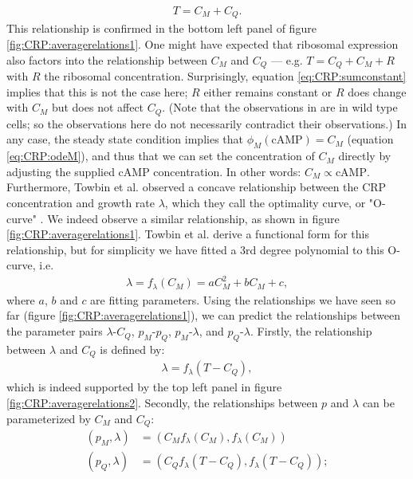 \begin{align}
	\label{eq:CRP:sumconstant}	
	T = C_M + C_Q
	.
\end{align}
This relationship is confirmed in the bottom left panel of figure \ref{fig:CRP:averagerelations1}. 
One might have expected that ribosomal expression also factors into the relationship between $C_M$ and $C_Q$ --- e.g. $T=C_Q+C_M+R$ with $R$ the ribosomal concentration.
Surprisingly, equation \ref{eq:CRP:sumconstant} implies that this is not the case here; $R$ either remains constant or $R$ does change with $C_M$ but does not affect $C_Q$.
%
(Note that the observations in \cite{You2013} are in wild type cells; so the observations here do not necessarily contradict their observations.)
%
In any case, the steady state condition implies that $\phi_M(\text{cAMP}) = C_M$ (equation \ref{eq:CRP:odeM}), and thus that we can set the concentration of $C_M$ directly by adjusting the supplied cAMP concentration.
In other words: $C_M \propto \text{cAMP}$.
Furthermore, Towbin et al. observed a concave relationship between the CRP concentration and growth rate $\lambda$, which they call the optimality curve, or "O-curve" \cite{Towbin2017}.
We indeed observe a similar relationship, as shown in figure \ref{fig:CRP:averagerelations1}. 
Towbin et al. derive a functional form for this relationship, but for simplicity we have fitted a 3rd degree polynomial to this O-curve, i.e.
\begin{align}
	\label{eq:CRP:muwithCRP}	
	\lambda = f_\lambda(C_M) = a C_M^2 + b C_M + c
	,
\end{align}
where $a$, $b$ and $c$ are fitting parameters.
%
Using the relationships we have seen so far (figure \ref{fig:CRP:averagerelations1}), 
we can predict the relationships between the parameter pairs 
$\lambda\text{-}C_Q$, $p_M\text{-}p_Q$, $p_M\text{-}\lambda$, and $p_Q\text{-}\lambda$.
%
Firstly, the relationship between $\lambda$ and $C_Q$ is defined by: 
\begin{align}
	\label{eq:CRP:muwithQ}	
	\lambda = f_\lambda(T-C_Q)
	,
\end{align}
which is indeed supported by the top left panel in figure \ref{fig:CRP:averagerelations2}.
%
Secondly, the relationships between $p$ and $\lambda$ can be parameterized by $C_M$ and $C_Q$: 
\begin{align}
	\label{eq:CRP:pmu}	
	\left(p_M, \lambda\right) & = \left(C_M f_\lambda(C_M), f_\lambda(C_M)\right) \nonumber \\ 
	\left(p_Q, \lambda\right) & = \left(C_Q f_\lambda(T-C_Q), f_\lambda(T-C_Q)\right)
	;
\end{align}

